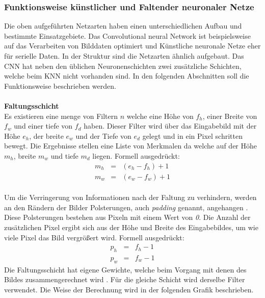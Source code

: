 \documentclass[a4paper,12pt,oneside]{article}
\begin{document}
  \subsubsection{Funktionsweise künstlicher und Faltender neuronaler Netze}\label{s.funktwknnundcnn}
Die oben aufgeführten Netzarten haben einen unterschiedlichen Aufbau und bestimmte Einsatzgebiete. Das Convolutional neural Network ist beispielsweise auf das Verarbeiten von Bilddaten optimiert und Künstliche neuronale Netze eher für serielle Daten. In der Struktur sind die Netzarten ähnlich aufgebaut. Das CNN hat neben den üblichen Neuronenschichten zwei zusätzliche Schichten, welche beim KNN nicht vorhanden sind. In den folgenden Abschnitten soll die Funktionsweise beschrieben werden.\\\\
\textbf{Faltungsschicht}\\
Es existieren eine menge von Filtern $n$ welche eine Höhe von $f_{h}$, einer Breite von $f_{w}$ und einer tiefe von $f_{d}$ haben. Dieser Filter wird über das Eingabebild mit der Höhe $e_{h}$, der breite $e_{w}$ und der Tiefe von $e_{d}$ gelegt und in ein Pixel schritten bewegt. Die Ergebnisse stellen eine Liste von Merkmalen da welche auf der Höhe $m_{h}$, breite $m_{w}$ und tiefe $m_{d}$ liegen. Formell ausgedrückt:\\
\begin{eqnarray} 
m_{h}&=&(e_{h} - f_{h})+1\\
m_{w}&=&(e_{w} - f_{w})+1
\end{eqnarray}\\
Um die Verringerung von Informationen nach der Faltung zu verhindern, werden an den Rändern der Bilder Polsterungen, auch \textit{padding} genannt, angehangen \cite[343]{goodfellow2016deep}. Diese Polsterungen bestehen aus Pixeln mit einem Wert von \textit{0}. Die Anzahl der zusätzlichen Pixel ergibt sich aus der Höhe und Breite des Eingabebildes, um wie viele Pixel das Bild vergrößert wird. Formell ausgedrückt:\\
\begin{eqnarray}
p_{h}&=&f_{h} - 1\\
p_{w}&=&f_{w} - 1
\end{eqnarray}
Die Faltungsschicht hat eigene Gewichte, welche beim Vorgang mit denen des Bildes zusammengerechnet wird \cite[331ff.]{goodfellow2016deep}. Für die gleiche Schicht wird derselbe Filter verwendet. Die Weise der Berechnung wird in der folgenden Grafik beschrieben.\\
\end{document}
